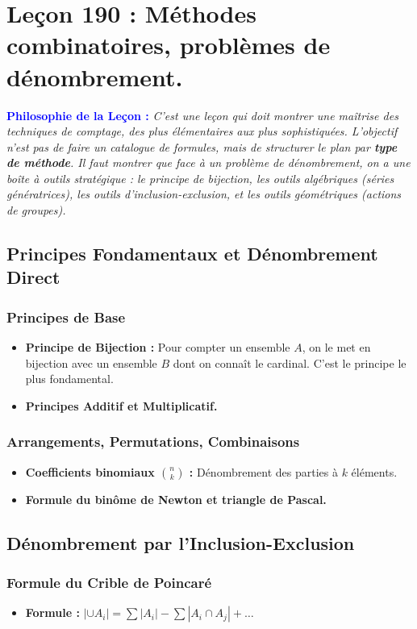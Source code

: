 \documentclass[12pt, a4paper, parskip=full]{report}
\theoremstyle{agregstyle}
\newenvironment{philosophie}
  {\par\medskip\noindent\begin{oframed}\noindent\textbf{\textcolor{blue}{Philosophie de la Leçon :}}\itshape}
  {\end{oframed}\par\medskip}
\begin{document}
\newpage
\chapter{Leçon 190 : Méthodes combinatoires, problèmes de dénombrement.}

\begin{philosophie}
    C'est une leçon qui doit montrer une maîtrise des techniques de comptage, des plus élémentaires aux plus sophistiquées. L'objectif n'est pas de faire un catalogue de formules, mais de structurer le plan par \textbf{type de méthode}. Il faut montrer que face à un problème de dénombrement, on a une boîte à outils stratégique : le principe de bijection, les outils algébriques (séries génératrices), les outils d'inclusion-exclusion, et les outils géométriques (actions de groupes).
\end{philosophie}

\section{Principes Fondamentaux et Dénombrement Direct}
\subsection{Principes de Base}
\begin{itemize}
    \item \textbf{Principe de Bijection :} Pour compter un ensemble $A$, on le met en bijection avec un ensemble $B$ dont on connaît le cardinal. C'est le principe le plus fondamental.
    \item \textbf{Principes Additif et Multiplicatif.}
\end{itemize}
\subsection{Arrangements, Permutations, Combinaisons}
\begin{itemize}
    \item \textbf{Coefficients binomiaux $\binom{n}{k}$ :} Dénombrement des parties à $k$ éléments.
    \item \textbf{Formule du binôme de Newton et triangle de Pascal.}
\end{itemize}

\section{Dénombrement par l'Inclusion-Exclusion}
\subsection{Formule du Crible de Poincaré}
\begin{itemize}
    \item \textbf{Formule :} $|\cup A_i| = \sum |A_i| - \sum |A_i \cap A_j| + \dots$
\end{itemize}
\end{document}
